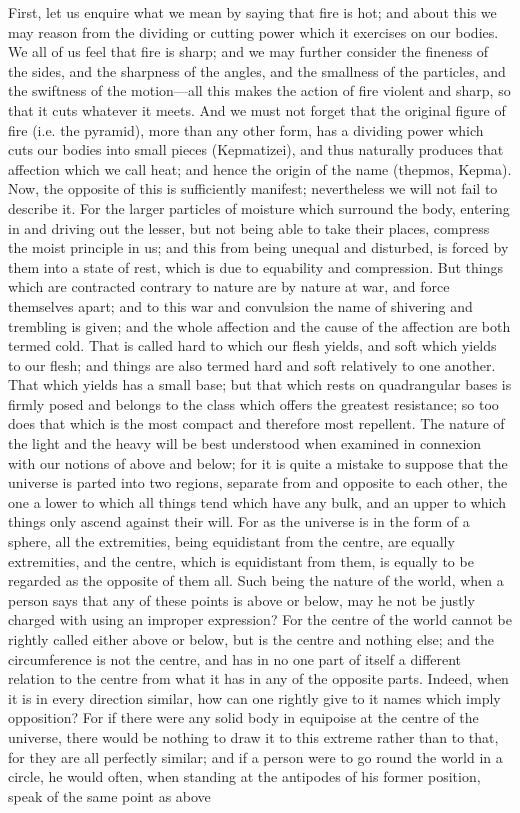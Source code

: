 \documentclass[11pt,letter]{article}
\begin{document}
\par  First, let us enquire what we mean by saying that fire is hot; and about this we may reason from the dividing or cutting power which it exercises on our bodies. We all of us feel that fire is sharp; and we may further consider the fineness of the sides, and the sharpness of the angles, and the smallness of the particles, and the swiftness of the motion—all this makes the action of fire violent and sharp, so that it cuts whatever it meets. And we must not forget that the original figure of fire (i.e. the pyramid), more than any other form, has a dividing power which cuts our bodies into small pieces (Kepmatizei), and thus naturally produces that affection which we call heat; and hence the origin of the name (thepmos, Kepma). Now, the opposite of this is sufficiently manifest; nevertheless we will not fail to describe it. For the larger particles of moisture which surround the body, entering in and driving out the lesser, but not being able to take their places, compress the moist principle in us; and this from being unequal and disturbed, is forced by them into a state of rest, which is due to equability and compression. But things which are contracted contrary to nature are by nature at war, and force themselves apart; and to this war and convulsion the name of shivering and trembling is given; and the whole affection and the cause of the affection are both termed cold. That is called hard to which our flesh yields, and soft which yields to our flesh; and things are also termed hard and soft relatively to one another. That which yields has a small base; but that which rests on quadrangular bases is firmly posed and belongs to the class which offers the greatest resistance; so too does that which is the most compact and therefore most repellent. The nature of the light and the heavy will be best understood when examined in connexion with our notions of above and below; for it is quite a mistake to suppose that the universe is parted into two regions, separate from and opposite to each other, the one a lower to which all things tend which have any bulk, and an upper to which things only ascend against their will. For as the universe is in the form of a sphere, all the extremities, being equidistant from the centre, are equally extremities, and the centre, which is equidistant from them, is equally to be regarded as the opposite of them all. Such being the nature of the world, when a person says that any of these points is above or below, may he not be justly charged with using an improper expression? For the centre of the world cannot be rightly called either above or below, but is the centre and nothing else; and the circumference is not the centre, and has in no one part of itself a different relation to the centre from what it has in any of the opposite parts. Indeed, when it is in every direction similar, how can one rightly give to it names which imply opposition? For if there were any solid body in equipoise at the centre of the universe, there would be nothing to draw it to this extreme rather than to that, for they are all perfectly similar; and if a person were to go round the world in a circle, he would often, when standing at the antipodes of his former position, speak of the same point as above 
\end{document}
